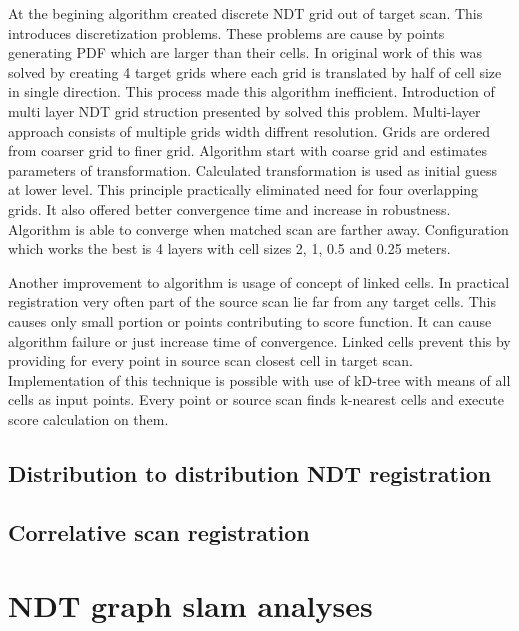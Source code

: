At the begining algorithm created discrete NDT grid out of target scan. This introduces discretization problems. These problems are cause by points generating PDF which are larger than their cells. In original work of \cite{Biber03} this was solved by creating 4 target grids where each grid is translated by half of cell size in single direction. This process made this algorithm inefficient. Introduction of multi layer NDT grid struction presented by \cite{ulas20113d} solved this problem. Multi-layer approach consists of multiple grids width diffrent resolution. Grids are ordered from coarser grid to finer grid. Algorithm start with coarse grid and estimates parameters of transformation. Calculated transformation is used as initial guess at lower level. This principle practically eliminated need for four overlapping grids. It also offered better convergence time and increase in robustness. Algorithm is able to converge when matched scan are farther away. Configuration which works the best is 4 layers with cell sizes 2, 1, 0.5 and 0.25 meters. 

Another improvement to algorithm is usage of concept of linked cells. In practical registration very often part of the source scan lie far from any target cells. This causes only small portion or points contributing to score function. It can cause algorithm failure or just increase time of convergence. Linked cells prevent this by providing for every point in source scan closest cell in target scan. Implementation of this technique is possible with use of kD-tree with means of all cells as input points. Every point or source scan finds k-nearest cells and execute score calculation on them.

 
\newpage
\subsection{Distribution to distribution NDT registration}
\label{D2D_NDT}
\newpage
\subsection{Correlative scan registration}
\label{Corr}
\newpage
\section{NDT graph slam analyses}

